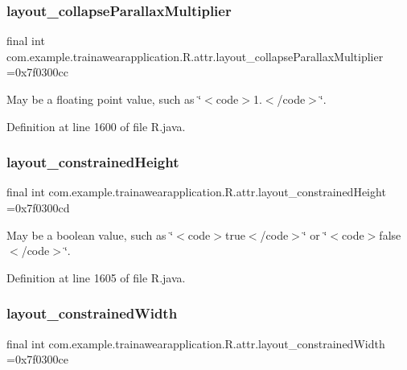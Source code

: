 \subsubsection{\texorpdfstring{layout\_collapseParallaxMultiplier}{layout\_collapseParallaxMultiplier}}
{\footnotesize\ttfamily final int com.\+example.\+trainawearapplication.\+R.\+attr.\+layout\+\_\+collapse\+Parallax\+Multiplier =0x7f0300cc\hspace{0.3cm}{\ttfamily [static]}}

May be a floating point value, such as \char`\"{}$<$code$>$1.$<$/code$>$\char`\"{}. 

Definition at line 1600 of file R.\+java.

\mbox{\label{classcom_1_1example_1_1trainawearapplication_1_1_r_1_1attr_af808d0f61b195c1d5db0322a9ae516ec}} 
\subsubsection{\texorpdfstring{layout\_constrainedHeight}{layout\_constrainedHeight}}
{\footnotesize\ttfamily final int com.\+example.\+trainawearapplication.\+R.\+attr.\+layout\+\_\+constrained\+Height =0x7f0300cd\hspace{0.3cm}{\ttfamily [static]}}

May be a boolean value, such as \char`\"{}$<$code$>$true$<$/code$>$\char`\"{} or \char`\"{}$<$code$>$false$<$/code$>$\char`\"{}. 

Definition at line 1605 of file R.\+java.

\mbox{\label{classcom_1_1example_1_1trainawearapplication_1_1_r_1_1attr_ad18f6105d5a1422f58cc83457ce0d689}} 
\subsubsection{\texorpdfstring{layout\_constrainedWidth}{layout\_constrainedWidth}}
{\footnotesize\ttfamily final int com.\+example.\+trainawearapplication.\+R.\+attr.\+layout\+\_\+constrained\+Width =0x7f0300ce\hspace{0.3cm}{\ttfamily [static]}}


